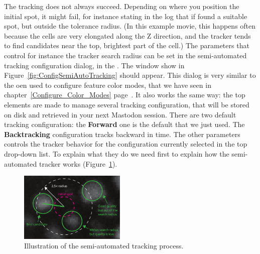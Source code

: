 The tracking does not always succeed. 
Depending on where you position the initial spot, it might fail, for instance stating in the log that if found a suitable spot, but outside the tolerance radius.
(In this example movie, this happens often because the cells are very elongated along the Z direction, and the tracker tends to find candidates near the top, brightest part of the cell.) 
The parameters that control for instance the tracker search radius can be set in the semi-automated tracking configuration dialog, in the .
The window show in Figure~\ref{fig:ConfigSemiAutoTracking} should appear.
This dialog is very similar to the oen used to configure feature color modes, that we have seen in chapter~\ref{Configure_Color_Modes} page~\pageref{Configure_Color_Modes}.
It also works the same way: the top elements are made to manage several tracking configuration, that will be stored on disk and retrieved in your next Mastodon session. 
There are two default tracking configuration: the \textbf{Forward} one is the default that we just used. 
The \textbf{Backtracking} configuration tracks backward in time. 
The other parameters controls the tracker behavior for the configuration currently selected in the top drop-down list.
To explain what they do we need first to explain how the semi-automated tracker works (Figure~\ref{fig:ExplainSemiAutoTracking}).

\begin{figure}
    \centering
    \includegraphics[width=0.45\textwidth]{figures/Mastodon_ExplainSemiAutoTracker_copie.pdf}
    \caption{Illustration of the semi-automated tracking process.}
    \label{fig:ExplainSemiAutoTracking}
\end{figure}

